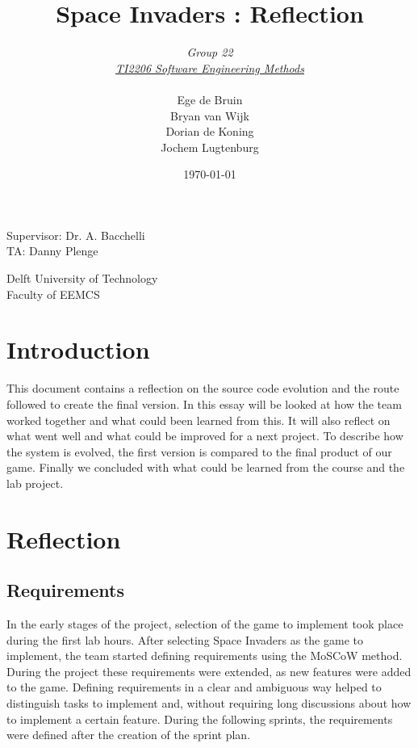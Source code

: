 \documentclass[10pt]{article}
\begin{document}
\title{Space Invaders : Reflection}
\date{\today}
\author{\textit{Group 22}\\ \textit{\underline{TI2206 Software Engineering Methods}} \\
 \\Ege de Bruin \\ Bryan van Wijk \\ Dorian de Koning \\ Jochem Lugtenburg }
 \maketitle  
 \begin{center}
Supervisor: Dr. A. Bacchelli\\
TA: Danny Plenge\\
 \end{center}     
 \begin{center}
 Delft University of Technology\\
 Faculty of EEMCS\\
 \end{center}
 \thispagestyle{empty}
 \pagebreak

\section*{Introduction}
This document contains a reflection on the source code evolution and the route followed to create the final version. In this essay will be looked at how the team worked together and what could been learned from this. It will also reflect on what went well and what could be improved for a next project. To describe how the system is evolved, the first version is compared to the final product of our game. Finally we concluded with what could be learned from the course and the lab project.

\newpage
\section*{Reflection}
\subsection*{Requirements}
In the early stages of the project, selection of the game to implement took place during the first lab hours. After selecting Space Invaders as the game to implement, the team started defining requirements using the MoSCoW method. During the project these requirements were extended, as new features were added to the game. Defining requirements in a clear and ambiguous way helped to distinguish tasks to implement and, without requiring long discussions about how to implement a certain feature. During the following sprints, the requirements were defined after the creation of the sprint plan.
\end{document}
